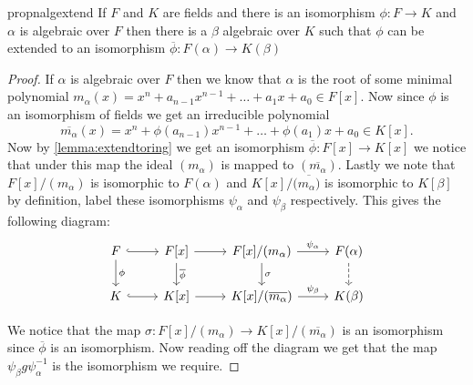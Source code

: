 \begin{restatable}{propn}{algextend}
\label{propn:algextend}
  If $F$ and $K$ are fields and there is an isomorphism $\phi: F \to K$ and
  $\alpha$ is algebraic over $F$ then there is a $\beta$ algebraic over $K$ 
  such that $\phi$ can be extended to an isomorphism $\overline{\phi}:
  F(\alpha) \to K(\beta)$
\end{restatable}
\begin{proof}
  If $\alpha$ is algebraic over $F$ then we know that $\alpha$ is the root of
  some minimal polynomial $m_{\alpha}(x) = x^{n} + a_{n-1}x^{n-1} + \ldots
  + a_1x + a_0 \in F[x]$. Now since $\phi$ is an isomorphism of fields we get
  an irreducible polynomial 
  \[
    \overline{m_{\alpha}}(x) = x^{n} + \phi(a_{n-1})x^{n-1} + \ldots
    + \phi(a_1)x + a_0 \in K[x]
  .\] 
  Now by \cref{lemma:extendtoring} we get an isomorphism $\overline{\phi}: F[x]
  \to K[x]$ we notice that under this map the ideal $(m_{\alpha})$ is mapped to
  $(\overline{m_{\alpha}})$. Lastly we note that $F[x]/(m_{\alpha})$ is
  isomorphic to $F(\alpha)$ and $K[x]/(\overline{m_{\alpha})}$ is isomorphic to
  $K[\beta]$ by definition, label these isomorphisms $\psi_{\alpha}$ and
  $\psi_{\beta}$ respectively. This gives the following diagram:
  \begin{equation}
  \begin{tikzcd}
    F  \arrow[r,hook] \arrow[d,"\phi"] & F[x] \arrow[r] \arrow[d,"\overline{\phi}"] 
                                        & F[x]/(m_{\alpha})
    \arrow[r,"\psi_{\alpha}"] \arrow[d,"\sigma"] & F(\alpha) \arrow[d,dashed] \\
    K \arrow[r,hook] & K[x] \arrow[r] & K[x]/(\overline{m_{\alpha}})
    \arrow[r,"\psi_{\beta}"] & K(\beta)
  \end{tikzcd}
  \end{equation}
  
  We notice that the map $\sigma: F[x]/(m_{\alpha}) \to
  K[x]/(\overline{m_{\alpha}})$ is an isomorphism since $\overline{\phi}$ is an
  isomorphism. Now reading off the diagram we get that the map
  $\psi_{\beta}g\psi_{\alpha}^{-1}$ is the isomorphism we require.
\end{proof}

